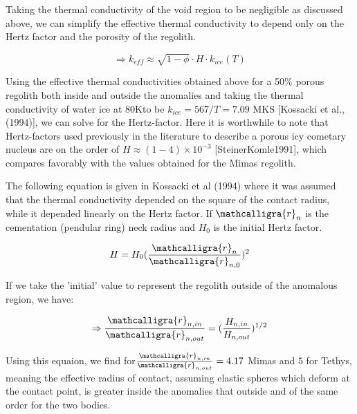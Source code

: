 \documentclass[11pt]{article} %
\newcommand{\sr}{\ensuremath{\mathcalligra{r}} \xspace}
\begin{document}
\begin{itemize}

	Taking the thermal conductivity of the void region to be negligible as discussed above, we can simplify the effective thermal conductivity to depend only on the Hertz factor and the porosity of the regolith.
	
	\begin{equation}
	\Rightarrow k_{eff} \approx \sqrt{1-\phi}\cdot H \cdot k_{ice}(T)
	\end{equation}
	
	Using the effective thermal conductivities obtained above for a 50\% porous regolith both inside and outside the anomalies and taking the thermal conductivity of water ice at 80Kto be $k_{ice} = 567/T = 7.09$ MKS [Kossacki et al., (1994)], we can solve for the Hertz-factor. Here it is worthwhile to note that Hertz-factors used previously in the literature to describe a porous icy cometary nucleus are on the order of  $H  \approx (1 - 4) \times10^{-3}$ [SteinerKomle1991], which compares favorably with the values obtained for the Mimas regolith. 

	The following equation is given in Kossacki et al (1994) where it was assumed that the thermal conductivity depended on the square of the contact radius, while it depended linearly on the Hertz factor. If $\sr_{n}$ is the cementation (pendular ring) neck radius and $H_{0}$ is the initial Hertz factor. 
	
	\begin{equation}
	H = H_{0} (\frac{\sr_{n}}{\sr_{n,0}})^{2} \\
	\end{equation}
	
	If we take the 'initial' value to represent the regolith outside of the anomalous region, we have:
	
	\begin{equation}
	\Rightarrow \frac{\sr_{n, in}}{\sr_{n, out}} = (\frac{H_{n, in}}{H_{n, out}})^{1/2}
	\end{equation}
	
	Using this equaion, we find for$\frac{\sr_{n, in}}{\sr_{n, out}} = 4.17$ Mimas and $5$ for Tethys, meaning the effective radius of contact, assuming elastic spheres which deform at the contact point, is greater inside the anomalies that outside and of the same order for the two bodies.
	

\end{itemize}
\end{document}
